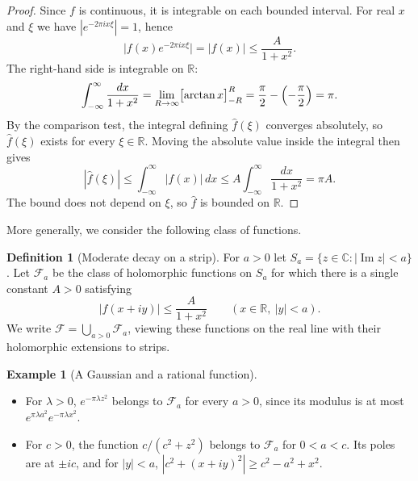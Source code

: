 \documentclass[11pt]{article}
\theoremstyle{plain}
\theoremstyle{definition}
\newtheorem{definition}[theorem]{Definition}
\newtheorem{example}[theorem]{Example}
\theoremstyle{boldremark}
\theoremstyle{remark}
\numberwithin{equation}{section}
\newcommand{\C}{\mathbb{C}}
\newcommand{\R}{\mathbb{R}}
\DeclareMathOperator{\Imag}{Im}
\begin{document}
\begin{proof}
Since $f$ is continuous, it is integrable on each bounded
interval. For real $x$ and $\xi$ we have $|e^{-2\pi i x\xi}|=1$, hence
\[
 \bigl|f(x)e^{-2\pi i x\xi}\bigr|=|f(x)|\leq\frac{A}{1+x^2}.
\]
The right-hand side is integrable on $\R$:
\[
 \int_{-\infty}^{\infty}\frac{dx}{1+x^2}
 =\lim_{R\to\infty}\bigl[\arctan x\bigr]_{-R}^{R}
 =\frac{\pi}{2}-\Bigl(-\frac{\pi}{2}\Bigr)=\pi .
\]
By the comparison test, the integral defining $\widehat f(\xi)$
converges absolutely, so $\widehat f(\xi)$ exists for every $\xi\in\R$.
Moving the absolute value inside the integral then gives
\[
 |\widehat f(\xi)|\leq\int_{-\infty}^{\infty}|f(x)|\,dx
 \leq A\int_{-\infty}^{\infty}\frac{dx}{1+x^2}=\pi A .
\]
The bound does not depend on $\xi$, so $\widehat f$ is bounded on $\R$.
\end{proof}


More generally, we consider the following class of functions.

\begin{definition}[Moderate decay on a strip]
For $a>0$ let $S_a=\{z\in\C:|\Imag z|<a\}$. Let $\mathcal F_a$ be
the class of holomorphic functions on $S_a$ for which there is a single
constant $A>0$ satisfying
\[
 |f(x+iy)|\leq\frac{A}{1+x^2}\qquad(x\in\R,\ |y|<a).
\]
We write $\mathcal F=\bigcup_{a>0}\mathcal F_a$, viewing these
functions on the real line with their holomorphic extensions to strips.
\end{definition}

\begin{example}[A Gaussian and a rational function]\mbox{}
\begin{itemize}
\item For $\lambda>0$, $e^{-\pi\lambda z^2}$ belongs to $\mathcal F_a$ for
every $a>0$, since its modulus is at most
$e^{\pi\lambda a^2}e^{-\pi\lambda x^2}$.

\item For $c>0$, the function $c/(c^2+z^2)$ belongs to $\mathcal F_a$ for
$0<a<c$. Its poles are at $\pm ic$, and for $|y|<a$,
$|c^2+(x+iy)^2|\geq c^2-a^2+x^2$. 
\end{itemize}
\end{example}
\end{document}
